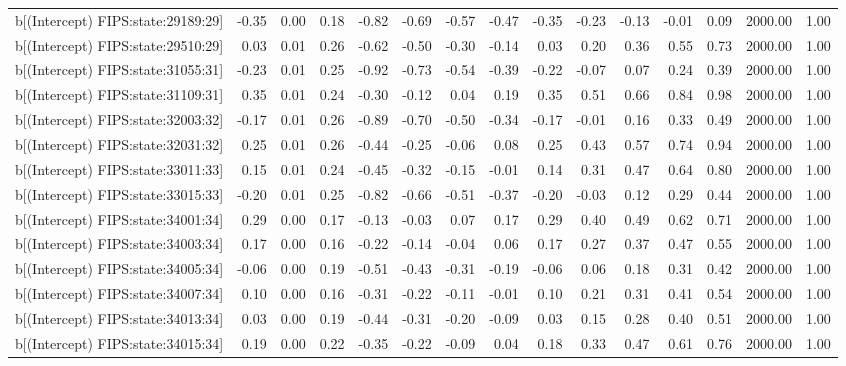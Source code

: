 \begin{table}[ht]
\begin{tabular}{rrrrrrrrrrrrrrr}
  b[(Intercept) FIPS:state:29189:29] & -0.35 & 0.00 & 0.18 & -0.82 & -0.69 & -0.57 & -0.47 & -0.35 & -0.23 & -0.13 & -0.01 & 0.09 & 2000.00 & 1.00 \\ 
  b[(Intercept) FIPS:state:29510:29] & 0.03 & 0.01 & 0.26 & -0.62 & -0.50 & -0.30 & -0.14 & 0.03 & 0.20 & 0.36 & 0.55 & 0.73 & 2000.00 & 1.00 \\ 
  b[(Intercept) FIPS:state:31055:31] & -0.23 & 0.01 & 0.25 & -0.92 & -0.73 & -0.54 & -0.39 & -0.22 & -0.07 & 0.07 & 0.24 & 0.39 & 2000.00 & 1.00 \\ 
  b[(Intercept) FIPS:state:31109:31] & 0.35 & 0.01 & 0.24 & -0.30 & -0.12 & 0.04 & 0.19 & 0.35 & 0.51 & 0.66 & 0.84 & 0.98 & 2000.00 & 1.00 \\ 
  b[(Intercept) FIPS:state:32003:32] & -0.17 & 0.01 & 0.26 & -0.89 & -0.70 & -0.50 & -0.34 & -0.17 & -0.01 & 0.16 & 0.33 & 0.49 & 2000.00 & 1.00 \\ 
  b[(Intercept) FIPS:state:32031:32] & 0.25 & 0.01 & 0.26 & -0.44 & -0.25 & -0.06 & 0.08 & 0.25 & 0.43 & 0.57 & 0.74 & 0.94 & 2000.00 & 1.00 \\ 
  b[(Intercept) FIPS:state:33011:33] & 0.15 & 0.01 & 0.24 & -0.45 & -0.32 & -0.15 & -0.01 & 0.14 & 0.31 & 0.47 & 0.64 & 0.80 & 2000.00 & 1.00 \\ 
  b[(Intercept) FIPS:state:33015:33] & -0.20 & 0.01 & 0.25 & -0.82 & -0.66 & -0.51 & -0.37 & -0.20 & -0.03 & 0.12 & 0.29 & 0.44 & 2000.00 & 1.00 \\ 
  b[(Intercept) FIPS:state:34001:34] & 0.29 & 0.00 & 0.17 & -0.13 & -0.03 & 0.07 & 0.17 & 0.29 & 0.40 & 0.49 & 0.62 & 0.71 & 2000.00 & 1.00 \\ 
  b[(Intercept) FIPS:state:34003:34] & 0.17 & 0.00 & 0.16 & -0.22 & -0.14 & -0.04 & 0.06 & 0.17 & 0.27 & 0.37 & 0.47 & 0.55 & 2000.00 & 1.00 \\ 
  b[(Intercept) FIPS:state:34005:34] & -0.06 & 0.00 & 0.19 & -0.51 & -0.43 & -0.31 & -0.19 & -0.06 & 0.06 & 0.18 & 0.31 & 0.42 & 2000.00 & 1.00 \\ 
  b[(Intercept) FIPS:state:34007:34] & 0.10 & 0.00 & 0.16 & -0.31 & -0.22 & -0.11 & -0.01 & 0.10 & 0.21 & 0.31 & 0.41 & 0.54 & 2000.00 & 1.00 \\ 
  b[(Intercept) FIPS:state:34013:34] & 0.03 & 0.00 & 0.19 & -0.44 & -0.31 & -0.20 & -0.09 & 0.03 & 0.15 & 0.28 & 0.40 & 0.51 & 2000.00 & 1.00 \\ 
  b[(Intercept) FIPS:state:34015:34] & 0.19 & 0.00 & 0.22 & -0.35 & -0.22 & -0.09 & 0.04 & 0.18 & 0.33 & 0.47 & 0.61 & 0.76 & 2000.00 & 1.00 \\ 

\end{tabular}
\end{table}
